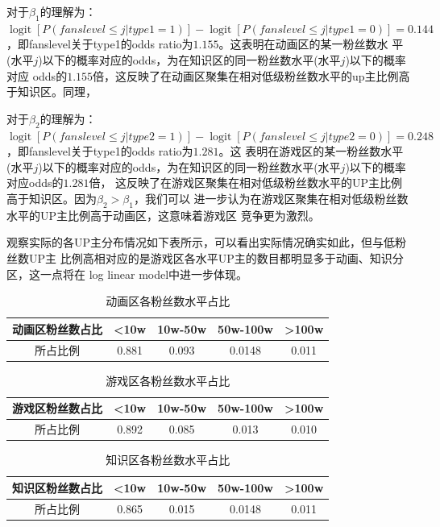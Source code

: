 \documentclass{ctexart}
\begin{document}
对于$\beta_1$的理解为：$\operatorname{logit}[P(fanslevel≤j|type1=1)]-\operatorname{logit}
[P(fanslevel≤j|type1=0)]=0.144$，即fanslevel关于type1的odds ratio为$1.155$。这表明在动画区的某一粉丝数水
平(水平$j$)以下的概率对应的odds，为在知识区的同一粉丝数水平(水平$j$)以下的概率对应
odds的$1.155$倍，这反映了在动画区聚集在相对低级粉丝数水平的up主比例高于知识区。同理，

对于$\beta_2$的理解为：$\operatorname{logit}[P(fanslevel≤j|type2=1)]-\operatorname{logit}
[P(fanslevel≤j|type2=0)]=0.248$，即fanslevel关于type1的odds ratio为$1.281$。这
表明在游戏区的某一粉丝数水平(水平$j$)以下的概率对应的odds，为在知识区的同一粉丝数水平(水平$j$)以下的概率对应odds的$1.281$倍，
这反映了在游戏区聚集在相对低级粉丝数水平的UP主比例高于知识区。因为$\beta_2>\beta_1$，我们可以
进一步认为在游戏区聚集在相对低级粉丝数水平的UP主比例高于动画区，这意味着游戏区
竞争更为激烈。

观察实际的各UP主分布情况如下表所示，可以看出实际情况确实如此，但与低粉丝数UP主
比例高相对应的是游戏区各水平UP主的数目都明显多于动画、知识分区，这一点将在
log linear model中进一步体现。

\begin{table}[H]
    \centering
    \begin{tabular}{ccccc}
        \toprule
         动画区粉丝数占比 & <10w & 10w-50w & 50w-100w & >100w  \\
        \midrule
         所占比例 & 0.881 & 0.093 & 0.0148 & 0.011 \\
        \bottomrule
    \end{tabular}
    \caption{动画区各粉丝数水平占比}
\end{table}
\begin{table}[H]
    \centering
    \begin{tabular}{ccccc}
        \toprule
         游戏区粉丝数占比 & <10w & 10w-50w & 50w-100w & >100w  \\
        \midrule
         所占比例 & 0.892 & 0.085 & 0.013 & 0.010 \\
        \bottomrule
    \end{tabular}
    \caption{游戏区各粉丝数水平占比}
\end{table}
\begin{table}[H]
    \centering
    \begin{tabular}{ccccc}
        \toprule
         知识区粉丝数占比 & <10w & 10w-50w & 50w-100w & >100w  \\
        \midrule
         所占比例 & 0.865 & 0.015 & 0.0148 & 0.011 \\
        \bottomrule
    \end{tabular}
    \caption{知识区各粉丝数水平占比}
\end{table}
\end{document}
